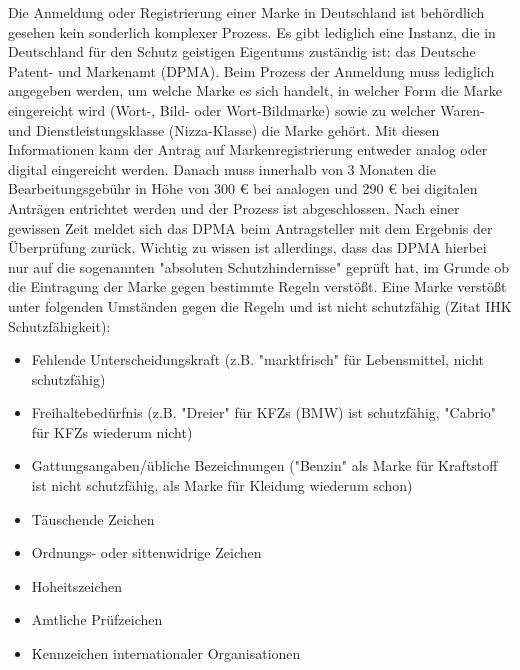 Die Anmeldung oder Registrierung einer Marke in Deutschland ist behördlich gesehen kein sonderlich komplexer Prozess. Es gibt lediglich eine Instanz, die in Deutschland für den Schutz geistigen Eigentums zuständig ist: das Deutsche Patent- und Markenamt (DPMA). Beim Prozess der Anmeldung muss lediglich angegeben werden, um welche Marke es sich handelt, in welcher Form die Marke eingereicht wird (Wort-, Bild- oder Wort-Bildmarke) sowie zu welcher Waren- und Dienstleistungsklasse (Nizza-Klasse) die Marke gehört. Mit diesen Informationen kann der Antrag auf Markenregistrierung entweder analog oder digital eingereicht werden. Danach muss innerhalb von 3 Monaten die Bearbeitungsgebühr in Höhe von 300 € bei analogen und 290 € bei digitalen Anträgen entrichtet werden und der Prozess ist abgeschlossen. Nach einer gewissen Zeit meldet sich das DPMA beim Antragsteller mit dem Ergebnis der Überprüfung zurück. Wichtig zu wissen ist allerdings, dass das DPMA hierbei nur auf die sogenannten "absoluten Schutzhindernisse" geprüft hat, im Grunde ob die Eintragung der Marke gegen bestimmte Regeln verstößt. Eine Marke verstößt unter folgenden Umständen gegen die Regeln und ist nicht schutzfähig (Zitat IHK Schutzfähigkeit): 

\begin{itemize}
    \item Fehlende Unterscheidungskraft (z.B. "marktfrisch" für Lebensmittel, nicht schutzfähig)
    \item Freihaltebedürfnis (z.B. "Dreier" für KFZs (BMW) ist schutzfähig, "Cabrio" für KFZs wiederum nicht)
    \item Gattungsangaben/übliche Bezeichnungen ("Benzin" als Marke für Kraftstoff ist nicht schutzfähig, als Marke für Kleidung wiederum schon)
    \item Täuschende Zeichen
    \item Ordnungs- oder sittenwidrige Zeichen
    \item Hoheitszeichen
    \item Amtliche Prüfzeichen
    \item Kennzeichen internationaler Organisationen
\end{itemize}

